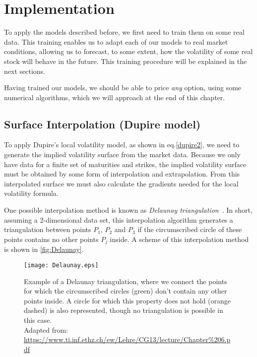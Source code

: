 \chapter{Implementation}
\label{chapter:implementation}
To apply the models described before, we first need to train them on some real data.
This training enables us to adapt each of our models to real market conditions, allowing us to forecast, to some extent, how the volatility of some real stock will behave in the future. This training procedure will be explained in the next sections.

Having trained our models, we should be able to price \emph{any} option, using some numerical algorithms, which we will approach at the end of this chapter.

\section{Surface Interpolation (Dupire model)}
\label{section:Surface Interpolation (Dupire)}
To apply Dupire's local volatility model, as shown in eq.\eqref{dupire2}, we need to generate the implied volatility surface from the market data. Because we only have data for a finite set of maturities and strikes, the implied volatility surface must be obtained by some form of interpolation and extrapolation. From this interpolated surface we must also calculate the gradients needed for the local volatility formula.

 
One possible interpolation method is known as \emph{Delaunay triangulation}~\citep{Isaac}. In short, assuming a 2-dimensional data set, this interpolation algorithm generates a triangulation between points $P_1$, $P_2$ and $P_3$ if the circumscribed circle of these points contains no other points $P_j$ inside. A scheme of this interpolation method is shown in \autoref{fig:Delaunay}.

\begin{figure}[!htb]
    \centering
      \texttt{[image: Delaunay.eps]}
      \caption[Example of a Delaunay triangulation, where we connect the points for which the circumscribed circles don't contain any other points inside. A circle for which this property does not hold is also represented, though no triangulation is possible in this case.]{Example of a Delaunay triangulation, where we connect the points for which the circumscribed circles (green) don't contain any other points inside. A circle for which this property does not hold (orange dashed) is also represented, though no triangulation is possible in this case.\\{\small Adapted from: \url{https://www.ti.inf.ethz.ch/ew/Lehre/CG13/lecture/Chapter\%206.pdf}}}\label{fig:Delaunay}
    \end{figure}

